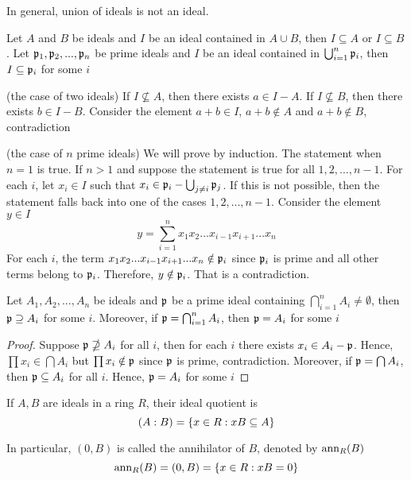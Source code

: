 \begin{remark}
	In general, union of ideals is not an ideal.
\end{remark}

\begin{proposition}
	Let $A$ and $B$ be ideals and $I$ be an ideal contained in $A \cup B$, then $I \subseteq A$ or $I \subseteq B$. Let $\mathfrak{p}_1, \mathfrak{p}_2, ..., \mathfrak{p}_n$ be prime ideals and $I$ be an ideal contained in $\bigcup_{i=1}^n \mathfrak{p}_i$, then $I \subseteq \mathfrak{p}_i$ for some $i$
\end{proposition}

\begin{longproof}
	(the case of two ideals) If $I \nsubseteq A$, then there exists $a \in I - A$. If $I \nsubseteq B$, then there exists $b \in I - B$. Consider the element $a + b \in I$, $a + b \notin A$ and $a + b \notin B$, contradiction
	
	(the case of $n$ prime ideals) We will prove by induction. The statement when $n = 1$ is true. If $n > 1$ and suppose the statement is true for all $1,2, ..., n-1$. For each $i$, let $x_i \in I$ such that $x_i \in \mathfrak{p}_i - \bigcup_{j \neq i} \mathfrak{p}_j$. If this is not possible, then the statement falls back into one of the cases $1,2, ..., n-1$. Consider the element $y \in I$
	$$
		y = \sum_{i=1}^n x_1 x_2 ... x_{i-1} x_{i+1} ... x_n
	$$
	For each $i$, the term $x_1 x_2 ... x_{i-1} x_{i+1} ... x_n \notin \mathfrak{p}_i$ since $\mathfrak{p}_i$ is prime and all other terms belong to $\mathfrak{p}_i$. Therefore, $y \notin \mathfrak{p}_i$. That is a contradiction.
\end{longproof}

\begin{proposition}
	Let $A_1, A_2, ..., A_n$ be ideals  and $\mathfrak{p}$ be a prime ideal containing $\bigcap_{i=1}^n A_i \neq \emptyset$, then $\mathfrak{p}  \supseteq A_i$ for some $i$. Moreover, if $\mathfrak{p} = \bigcap_{i=1}^n A_i$, then $\mathfrak{p}  = A_i$ for some $i$
\end{proposition}

\begin{proof}
	Suppose $\mathfrak{p} \nsupseteq A_i$ for all $i$, then for each $i$ there exists $x_i \in A_i - \mathfrak{p}$. Hence, $\prod x_i \in \bigcap A_i$ but $\prod x_i \notin \mathfrak{p}$ since $\mathfrak{p}$ is prime, contradiction. Moreover, if $\mathfrak{p} = \bigcap A_i$, then $\mathfrak{p} \subseteq A_i$ for all $i$. Hence, $\mathfrak{p} = A_i$ for some $i$
\end{proof}

\begin{definition}
	If $A, B$ are ideals in a ring $R$, their ideal quotient is
	$$
		(A : B) = \{x \in R: xB \subseteq A\}
	$$
	
	In particular, $(0, B)$ is called the annihilator of $B$, denoted by $\operatorname{ann}_R(B)$
	$$
		\operatorname{ann}_R(B) = (0, B) = \{x \in R: xB = 0\}
	$$
\end{definition}

